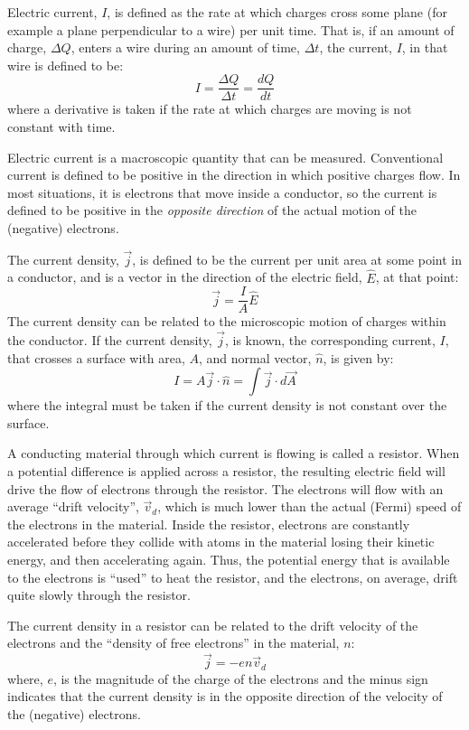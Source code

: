 Electric current, $I$, is defined as the rate at which charges cross some plane (for example a plane perpendicular to a wire) per unit time. That is, if an amount of charge, $\Delta Q$, enters a wire during an amount of time, $\Delta t$, the current, $I$, in that wire is defined to be:
\begin{equation}
I=\frac{\Delta Q}{\Delta t}=\frac{dQ}{dt}
\end{equation}
where a derivative is taken if the rate at which charges are moving is not constant with time.

Electric current is a macroscopic quantity that can be measured. Conventional current is defined to be positive in the direction in which positive charges flow. In most situations, it is electrons that move inside a conductor, so the current is defined to be positive in the \textit{opposite direction} of the actual motion of the (negative) electrons.

The current density, $\vec j$, is defined to be the current per unit area at some point in a conductor, and is a vector in the direction of the electric field, $\hat E$, at that point:
\begin{equation}
\vec j = \frac{I}{A}\hat E
\end{equation}
The current density can be related to the microscopic motion of charges within the conductor. If the current density, $\vec j$, is known, the corresponding current, $I$, that crosses a surface with area, $A$, and normal vector, $\hat n$, is given by:
\begin{equation}
I=A \vec j\cdot \hat n=\int \vec j \cdot d\vec A
\end{equation}
where the integral must be taken if the current density is not constant over the surface.

A conducting material through which current is flowing is called a resistor. When a potential difference is applied across a resistor, the resulting electric field will drive the flow of electrons through the resistor. The electrons will flow with an average ``drift velocity'', $\vec v_d$, which is much lower than the actual (Fermi) speed of the electrons in the material. Inside the resistor, electrons are constantly accelerated before they collide with atoms in the material losing their kinetic energy, and then accelerating again. Thus, the potential energy that is available to the electrons is ``used'' to heat the resistor, and the electrons, on average, drift quite slowly through the resistor.

The current density in a resistor can be related to the drift velocity of the electrons and the ``density of free electrons'' in the material, $n$:
\begin{equation}
\vec j = -en\vec v_d
\end{equation}
where, $e$,  is the magnitude of the charge of the electrons and the minus sign indicates that the current density is in the opposite direction of the velocity of the (negative) electrons.

